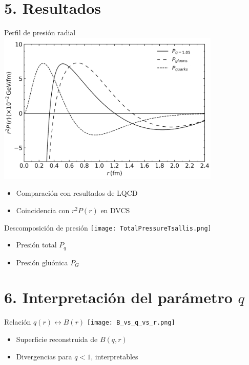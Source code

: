 \documentclass{beamer}
\begin{document}
\section[Resultados]{5. Resultados}
\begin{frame}{Perfil de presión radial}
  \includegraphics[width=0.8\textwidth]{figures/PressureDistributionsTot-Q-G.png}
  \begin{itemize}
    \item Comparación con resultados de LQCD
    \item Coincidencia con \( r^2 P(r) \) en DVCS
  \end{itemize}
\end{frame}

\begin{frame}{Descomposición de presión}
  \texttt{[image: TotalPressureTsallis.png]}
  \begin{itemize}
    \item Presión total \( P_q \)
    \item Presión gluónica \( P_G \)
  \end{itemize}
\end{frame}
\section[Interpretación del parámetro \( q \)]{6. Interpretación del parámetro \( q \)}
\begin{frame}{Relación \( q(r) \leftrightarrow B(r) \)}
  \texttt{[image: B\_vs\_q\_vs\_r.png]}
  \begin{itemize}
    \item Superficie reconstruida de \( B(q, r) \)
    \item Divergencias para \( q < 1 \), interpretables
  \end{itemize}
\end{frame}
\end{document}
